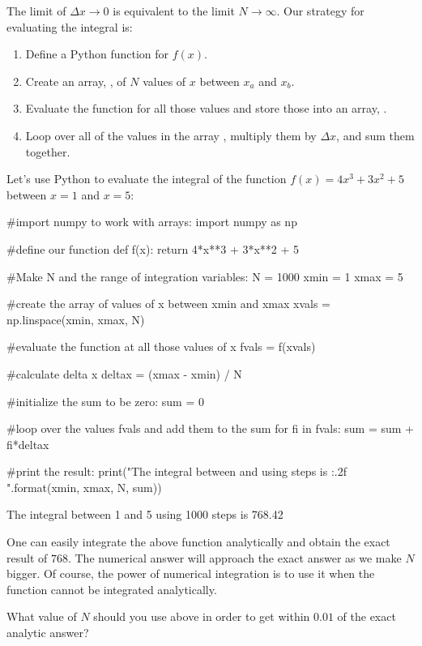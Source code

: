 The limit of $\Delta x \to 0$ is equivalent to the limit $N \to \infty$. Our strategy for evaluating the integral is:
\begin{enumerate}
\item Define a Python function for $f(x)$.
\item Create an array, , of $N$ values of $x$ between $x_a$ and $x_b$.
\item Evaluate the function for all those values and store those into an array, .
\item Loop over all of the values in the array , multiply them by $\Delta x$, and sum them together.
\end{enumerate}
Let's use Python to evaluate the integral of the function $f(x)=4x^3+3x^2+5$ between $x=1$ and $x=5$:
\begin{python}[caption=Numerical integration of a function] 
#import numpy to work with arrays:
import numpy as np

#define our function
def f(x):
  return 4*x**3 + 3*x**2 + 5
  
#Make N and the range of integration variables:
N = 1000
xmin = 1
xmax = 5

#create the array of values of x between xmin and xmax
xvals = np.linspace(xmin, xmax, N)

#evaluate the function at all those values of x
fvals = f(xvals)

#calculate delta x
deltax = (xmax - xmin) / N

#initialize the sum to be zero:
sum = 0

#loop over the values fvals and add them to the sum
for fi in fvals:
  sum = sum + fi*deltax

#print the result:
print("The integral between {} and {} using {} steps is {:.2f} ".format(xmin, xmax, N, sum))

\end{python}
\begin{poutput}
The integral between 1 and 5 using 1000 steps is 768.42 
\end{poutput}
One can easily integrate the above function analytically and obtain the exact result of $\num{768}$. The numerical answer will approach the exact answer as we make $N$ bigger. Of course, the power of numerical integration is to use it when the function cannot be integrated analytically.

\begin{checkpoint}{What value of $N$ should you use above in order to get within $\num{0.01}$ of the exact analytic answer?}
\end{checkpoint}


